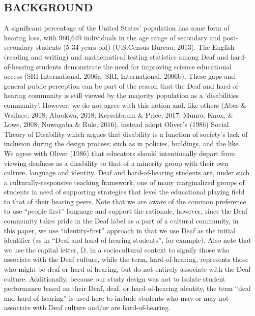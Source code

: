 \documentclass[11.5pt]{sig-alternate} %
\begin{document}
\begin{large}
\section*{BACKGROUND}

A significant percentage of the United States’ population has some form of hearing loss, with 960,649 individuals in the age range of secondary and post-secondary students (5-34 years old) (U.S.Census Bureau, 2013). The English (reading and writing) and mathematical testing statistics among Deaf and hard-of-hearing students demonstrate the need for improving science educational access (SRI International, 2006a; SRI, International, 2006b). These gaps and general public perception can be part of the reason that the Deaf and hard-of-hearing community is still viewed by the majority population as a ‘disabilities community’. However, we do not agree with this notion and, like others (Abes \& Wallace, 2018; Abrokwa, 2018; Kerschbaum \& Price, 2017; Munro, Knox, \& Lowe, 2008; Nuwagaba \& Rule, 2016), instead adopt Oliver’s (1986) Social Theory of Disability which argues that disability is a function of society’s lack of inclusion during the design process; such as in policies, buildings, and the like. We agree with Oliver (1986) that educators should intentionally depart from viewing deafness as a disability to that of a minority group with their own culture, language and identity. Deaf and hard-of-hearing students are, under such a culturally-responsive teaching framework, one of many marginalized groups of students in need of supporting strategies that level the educational playing field to that of their hearing peers. Note that we are aware of the common preference to use “people first” language and support the rationale, however, since the Deaf community takes pride in the Deaf label as a part of a cultural community, in this paper, we use “identity-first” approach in that we use Deaf as the initial identifier (as in “Deaf and hard-of-hearing students”, for example). Also note that we use the capital letter, D, in a sociocultural context to signify those who associate with the Deaf culture, while the term, hard-of-hearing, represents those who might be deaf or hard-of-hearing, but do not entirely associate with the Deaf culture. Additionally, because our study design was not to isolate student performance based on their Deaf, deaf, or hard-of-hearing identity, the term “deaf and hard-of-hearing” is used here to include students who may or may not associate with Deaf culture and/or are hard-of-hearing.


\end{large}
\end{document}
